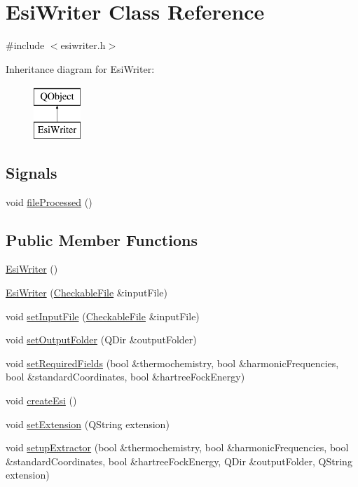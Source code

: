 \hypertarget{class_esi_writer}{}\section{Esi\+Writer Class Reference}
\label{class_esi_writer}


{\ttfamily \#include $<$esiwriter.\+h$>$}

Inheritance diagram for Esi\+Writer\+:\begin{figure}[H]
\begin{center}
\leavevmode
\includegraphics[height=2.000000cm]{class_esi_writer}
\end{center}
\end{figure}
\subsection*{Signals}
\begin{DoxyCompactItemize}
\item 
void \hyperlink{class_esi_writer_a5761a75e40cdd764e9f6f4384db9691f}{file\+Processed} ()
\end{DoxyCompactItemize}
\subsection*{Public Member Functions}
\begin{DoxyCompactItemize}
\item 
\hyperlink{class_esi_writer_a4778aeaa6975d47db1af27c803329756}{Esi\+Writer} ()
\item 
\hyperlink{class_esi_writer_a8828e280684c454cb2ffb18355300b29}{Esi\+Writer} (\hyperlink{class_checkable_file}{Checkable\+File} \&input\+File)
\item 
void \hyperlink{class_esi_writer_a74756630da3cb105db6a9804d96544d8}{set\+Input\+File} (\hyperlink{class_checkable_file}{Checkable\+File} \&input\+File)
\item 
void \hyperlink{class_esi_writer_a4fff58c132284f4ace93f1db36d683e0}{set\+Output\+Folder} (Q\+Dir \&output\+Folder)
\item 
void \hyperlink{class_esi_writer_a0dcece5d6d4c3a172b16b053772fd4aa}{set\+Required\+Fields} (bool \&thermochemistry, bool \&harmonic\+Frequencies, bool \&standard\+Coordinates, bool \&hartree\+Fock\+Energy)
\item 
void \hyperlink{class_esi_writer_a5d9ec4ef42a6e0cc41ded636e70b5325}{create\+Esi} ()
\item 
void \hyperlink{class_esi_writer_a1e587bc3832358745e93cbd7206cff5a}{set\+Extension} (Q\+String extension)
\item 
void \hyperlink{class_esi_writer_a641bf40892ae0e06fd9d0a4d5560cc42}{setup\+Extractor} (bool \&thermochemistry, bool \&harmonic\+Frequencies, bool \&standard\+Coordinates, bool \&hartree\+Fock\+Energy, Q\+Dir \&output\+Folder, Q\+String extension)
\end{DoxyCompactItemize}


